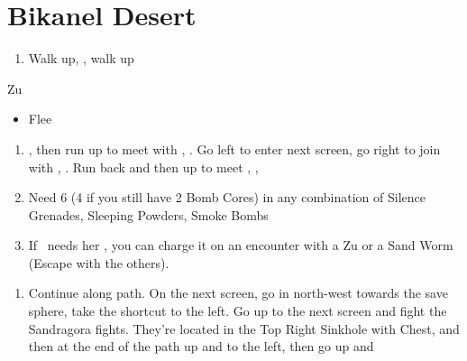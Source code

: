 \chapter{Bikanel Desert}

\begin{enumerate}
    \item Walk up, \sd, walk up
\end{enumerate}
\begin{battle}{Zu}
    \begin{itemize}
        \tidusf Attack
        \enemyf Attack
        \tidusf Equip Sonic Steel
        \tidusf Defend until \lulu\ shows up
        \auronf Defend until \lulu\ shows up
        \item Flee
    \end{itemize}
\end{battle}
\begin{enumerate}[resume]
    \item \sd, then run up to meet with \wakka, \sd. Go left to enter next screen, go right to join with \kimahri, \sd. Run back and then up to meet \rikku, \sd, \save
    \item Need 6 (4 if you still have 2 Bomb Cores) in any combination of Silence Grenades, Sleeping Powders, Smoke Bombs
    \item If \rikku\ needs her \od, you can charge it on an encounter with a Zu or a Sand Worm (Escape with the others).
\end{enumerate}
\begin{enumerate}[resume]
    \item Continue along path. On the next screen, go in north-west towards the save sphere, take the shortcut to the left. Go up to the next screen and fight the Sandragora fights. They're located in the Top Right Sinkhole with Chest, and then at the end of the path up and to the left, then go up and \sd
\end{enumerate}
